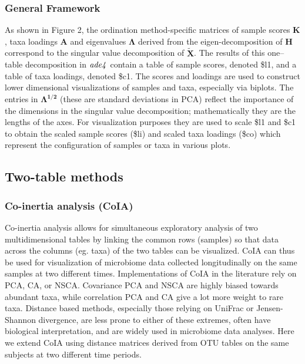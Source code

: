 \documentclass[doublespacing]{bmcart}
\def\texttt{[image: ]}
\def\H{\mathbf{H}}
\def\X{\mathbf{X}}
\def\A{\mathbf{A}}
\def\K{\mathbf{K}}
\begin{document}
\subsubsection*{General Framework}
As shown in Figure 2, the ordination method-specific matrices of sample scores $\K$, taxa loadings $\A$ and eigenvalues $\mathbf{\Lambda}$ derived from the eigen-decomposition of $\H$ correspond to the singular value decomposition of $\tilde{\X}$.  The results of this one--table decomposition in $\it ade4$ contain a table of sample scores, denoted \$l1, and a table of taxa loadings, denoted \$c1.  The scores and loadings are used to construct lower dimensional visualizations of samples and taxa, especially via biplots.  The entries in $\mathbf{\Lambda^{1/2}}$ (these are standard deviations in PCA) reflect the importance of the dimensions in the singular value decomposition; mathematically they are the lengths of the axes.  For visualization purposes they are used to scale \$l1 and \$c1 to obtain the scaled sample scores (\$li) and scaled taxa loadings (\$co) which represent the configuration of samples or taxa in various plots. 
\subsection*{Two-table methods}
\subsubsection*{Co-inertia  analysis (CoIA)}
Co-inertia analysis allows for simultaneous exploratory analysis of two multidimensional tables by linking the common rows (samples) so that data across the columns (eg. taxa) of the two tables can be visualized.  CoIA can thus be used for visualization of microbiome data collected longitudinally on the same samples at two different times. Implementations of CoIA in the literature 
 \cite{Dray3} rely on PCA, CA, or NSCA. Covariance PCA and NSCA are highly biased towards abundant taxa, while correlation PCA and CA give a lot more weight to rare taxa. Distance based methods, especially those relying on UniFrac or Jensen-Shannon divergence, are less prone to either of these extremes, often have biological interpretation, and are widely used in microbiome data analyses. Here we extend CoIA using distance matrices derived from OTU tables on the same subjects at two different time periods. 
\end{document}
